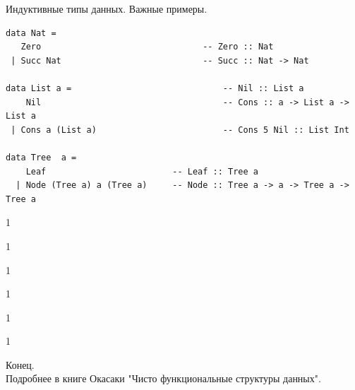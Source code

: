 \documentclass[aspectratio=169
  , xcolor={svgnames}
  , hyperref={ colorlinks,citecolor=DeepPink4
             , linkcolor=DarkRed,urlcolor=DarkBlue}
  , russian
  ]{beamer}
\theoremstyle{exerciseStyle1}
\begin{document}
\begin{frame}[fragile]{Индуктивные типы данных. Важные примеры.}
\begin{verbatim}
data Nat = 
   Zero                                -- Zero :: Nat
 | Succ Nat                            -- Succ :: Nat -> Nat

data List a =                              -- Nil :: List a
    Nil                                    -- Cons :: a -> List a -> List a
 | Cons a (List a)                         -- Cons 5 Nil :: List Int

data Tree  a = 
    Leaf                         -- Leaf :: Tree a
  | Node (Tree a) a (Tree a)     -- Node :: Tree a -> a -> Tree a -> Tree a
\end{verbatim}
\end{frame}

\begin{frame}[fragile]{}
1
\end{frame}

\begin{frame}[fragile]{}
1
\end{frame}

\begin{frame}[fragile]{}
1
\end{frame}

\begin{frame}[fragile]{}
1
\end{frame}

\begin{frame}[fragile]{}
1
\end{frame}

\begin{frame}[fragile]{}
1
\end{frame}

%
%
%
%
%


\begin{frame}
\begin{center}
  {\Huge Конец.}\\
  
  Подробнее в книге Окасаки "Чисто функциональные структуры данных".
\end{center}
\end{frame}
\end{document}
